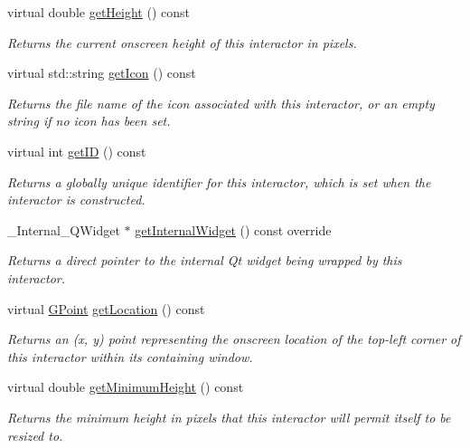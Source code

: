 \begin{DoxyCompactItemize}
virtual double \mbox{\hyperlink{classsgl_1_1GInteractor_a1e7e353362434072875264cf95629f99}{get\+Height}} () const
\begin{DoxyCompactList}\small\item\em Returns the current onscreen height of this interactor in pixels. \end{DoxyCompactList}\item 
virtual std\+::string \mbox{\hyperlink{classsgl_1_1GInteractor_aaed62a73004939a64da6f0eb9eb64d73}{get\+Icon}} () const
\begin{DoxyCompactList}\small\item\em Returns the file name of the icon associated with this interactor, or an empty string if no icon has been set. \end{DoxyCompactList}\item 
virtual int \mbox{\hyperlink{classsgl_1_1GInteractor_a9c9659a6c6ba66b4107ba59c95a24241}{get\+ID}} () const
\begin{DoxyCompactList}\small\item\em Returns a globally unique identifier for this interactor, which is set when the interactor is constructed. \end{DoxyCompactList}\item 
\+\_\+\+Internal\+\_\+\+Q\+Widget $\ast$ \mbox{\hyperlink{classsgl_1_1GButton_a2f6b36b2517087dc90a366b5ce1f5323}{get\+Internal\+Widget}} () const override
\begin{DoxyCompactList}\small\item\em Returns a direct pointer to the internal Qt widget being wrapped by this interactor. \end{DoxyCompactList}\item 
virtual \mbox{\hyperlink{structsgl_1_1GPoint}{G\+Point}} \mbox{\hyperlink{classsgl_1_1GInteractor_a4f83802015511edeb63b892830812c11}{get\+Location}} () const
\begin{DoxyCompactList}\small\item\em Returns an (x, y) point representing the onscreen location of the top-\/left corner of this interactor within its containing window. \end{DoxyCompactList}\item 
virtual double \mbox{\hyperlink{classsgl_1_1GInteractor_aed4b0075fcc434499c3cb3e46896bda3}{get\+Minimum\+Height}} () const
\begin{DoxyCompactList}\small\item\em Returns the minimum height in pixels that this interactor will permit itself to be resized to. \end{DoxyCompactList}\item 

\end{DoxyCompactItemize}
